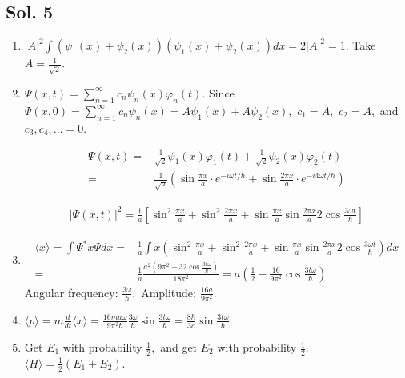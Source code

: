 \subsection*{Sol. 5}
\begin{enumerate}
    \item 
    $|A|^2\int (\psi_1(x)+\psi_2(x))(\psi_1(x)+\psi_2(x))dx
        =2|A|^2=1.$ Take $A=\frac{1}{\sqrt{2}}.$
        \item 
        $\Psi(x, t) = \sum_{n=1}^\infty c_n\psi_n(x)\varphi_n(t).$
    Since $\Psi(x,0)=\sum_{n=1}^\infty c_n\psi_n(x) = A\psi_1(x)+A\psi_2(x),$ $c_1=A,$ $c_2=A,$ and $c_3, c_4, \dots = 0.$

    \begin{align*}
    \Psi(x, t)= & 
    \frac{1}{\sqrt{2}}\psi_1(x)\varphi_1(t) + 
    \frac{1}{\sqrt{2}}\psi_2(x)\varphi_2(t)\\
    =& \frac{1}{\sqrt{a}}
    \left(
    \sin\frac{\pi x}{a}\cdot e^{-i\omega t/\hbar} + 
    \sin\frac{2\pi x}{a}\cdot e^{-i4\omega t/\hbar}
    \right)
    \end{align*}

    \begin{align*}
        |\Psi(x,t)|^2=\frac{1}{a}
        \left[
    \sin^2\frac{\pi x}{a}
    +\sin^2\frac{2\pi x}{a}
    +\sin\frac{\pi x}{a} \sin\frac{2\pi x}{a}
    2\cos\frac{3\omega t}{\hbar}
    \right]
    \end{align*}
    \item 
\begin{align*}
    \langle x\rangle = \int\Psi^*x\Psi dx= & 
    \frac{1}{a} \int x(
    \sin^2\frac{\pi x}{a}
    +\sin^2\frac{2\pi x}{a}
    +\sin\frac{\pi x}{a} \sin\frac{2\pi x}{a}
    2\cos\frac{3\omega t}{\hbar}
    )dx\\
    =& \frac{1}{a}\frac{a^2(9\pi^2-32\cos\frac{3t\omega}{\hbar})}{18\pi^2}
    =a\left(\frac{1}{2}-\frac{16}{9\pi^2}\cos\frac{3t\omega}{\hbar}
    \right)
\end{align*}
Angular frequency: $\frac{3\omega}{\hbar},$
Amplitude: $\frac{16a}{9\pi^2}.$

\item 
$\langle p \rangle = m\frac{d}{dt}\langle x\rangle
= \frac{16ma\omega}{9\pi^2\hbar}\frac{3\omega}{\hbar}\sin \frac{3t\omega}{\hbar}=
\frac{8\hbar}{3a}\sin \frac{3t\omega}{\hbar}
.
$
\item Get $E_1$ with probability $\frac{1}{2},$ and get $E_2$ with probability $\frac{1}{2}.$
$\langle H\rangle=\frac{1}{2}(E_1+E_2).$
    
    
\end{enumerate}



